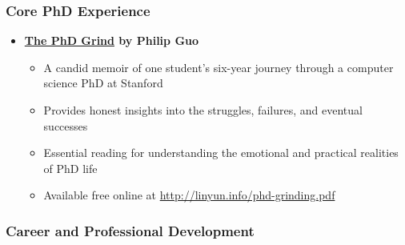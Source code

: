 \documentclass[11pt,a4paper]{article}
\begin{document}
\subsubsection{Core PhD Experience}

\begin{itemize}
    \item \textbf{\href{http://linyun.info/phd-grinding.pdf}{The PhD Grind} by Philip Guo}
    \begin{itemize}
        \item A candid memoir of one student's six-year journey through a computer science PhD at Stanford
        \item Provides honest insights into the struggles, failures, and eventual successes
        \item Essential reading for understanding the emotional and practical realities of PhD life
        \item Available free online at \url{http://linyun.info/phd-grinding.pdf}
    \end{itemize}
    
\end{itemize}

\subsubsection{Career and Professional Development}
\end{document}
